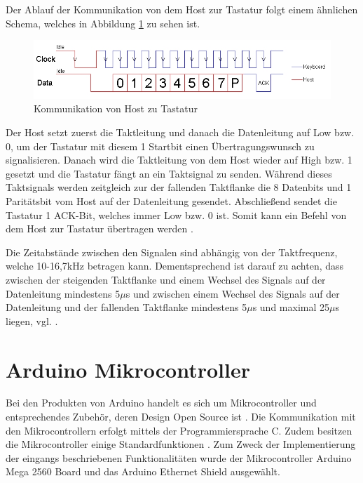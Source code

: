 Der Ablauf der Kommunikation von dem Host zur Tastatur folgt einem ähnlichen Schema, welches in Abbildung \ref{host_to_device} \cite{host_to_device} zu sehen ist.
\begin{figure}
  \centering
  \includegraphics[width=1\textwidth]{images/host_to_device.jpg}
  \caption{Kommunikation von Host zu Tastatur}
  \label{host_to_device}
\end{figure}
Der Host setzt zuerst die Taktleitung und danach die Datenleitung auf Low bzw. 0, um der Tastatur mit diesem 1 Startbit einen Übertragungswunsch zu signalisieren. Danach wird die Taktleitung von dem Host wieder auf High bzw. 1 gesetzt und die Tastatur fängt an ein Taktsignal zu senden. Während dieses Taktsignals werden zeitgleich zur der fallenden Taktflanke die 8 Datenbits und 1 Paritätsbit vom Host auf der Datenleitung gesendet. Abschließend sendet die Tastatur 1 ACK-Bit, welches immer Low bzw. 0 ist. Somit kann ein Befehl von dem Host zur Tastatur übertragen werden \cite{chapweske} \cite{mock}.

Die Zeitabstände zwischen den Signalen sind abhängig von der Taktfrequenz, welche 10-16,7kHz betragen kann. Dementsprechend ist darauf zu achten, dass zwischen der steigenden Taktflanke und einem Wechsel des Signals auf der Datenleitung mindestens 5$\mu$s und zwischen einem Wechsel des Signals auf der Datenleitung und der fallenden Taktflanke mindestens 5$\mu$s und maximal 25$\mu$s liegen, vgl. \cite{chapweske} \cite{mock}.



\section{Arduino Mikrocontroller}
Bei den Produkten von Arduino handelt es sich um Mikrocontroller und entsprechendes Zubehör, deren Design Open Source ist \cite{arduino}. Die Kommunikation mit den Mikrocontrollern erfolgt mittels der Programmiersprache C. Zudem besitzen die Mikrocontroller einige Standardfunktionen \cite{arduino_language}. Zum Zweck der Implementierung der eingangs beschriebenen Funktionalitäten wurde der Mikrocontroller Arduino Mega 2560 Board \cite{arduino_mega} und das Arduino Ethernet Shield \cite{arduino_ethernet} ausgewählt.

